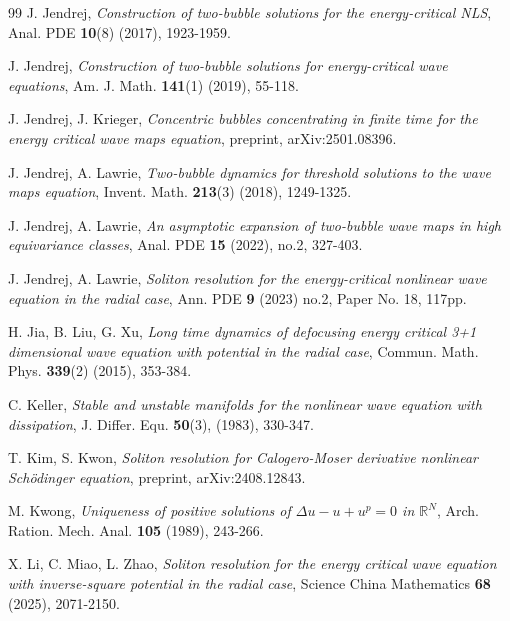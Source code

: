 \documentclass[reqno]{amsart}
\theoremstyle{plain}
\theoremstyle{definition}
\numberwithin{equation}{section}
\newcommand{\1}{\mathbbm{1}}
\begin{document}
\begin{thebibliography}{99}
 J. Jendrej,
\textit{Construction of two-bubble solutions for the energy-critical NLS},
Anal. PDE \textbf{10}(8) (2017), 1923-1959.

 J. Jendrej, 
\textit{Construction of two-bubble solutions for energy-critical wave equations},
Am. J. Math. \textbf{141}(1) (2019), 55-118.

 J. Jendrej, J. Krieger,
\textit{Concentric bubbles concentrating in finite time for the energy critical wave maps equation},
preprint, arXiv:2501.08396.


 J. Jendrej, A. Lawrie,
\textit{Two-bubble dynamics for threshold solutions to the wave maps equation},
Invent. Math. \textbf{213}(3) (2018), 1249-1325.


 J. Jendrej, A. Lawrie,
\textit{An asymptotic expansion of two-bubble wave maps in high equivariance classes},
Anal. PDE \textbf{15} (2022), no.2, 327-403.

 J. Jendrej, A. Lawrie,
\textit{Soliton resolution for the energy-critical nonlinear wave equation in the radial case},
Ann. PDE \textbf{9} (2023) no.2, Paper No. 18, 117pp.



 H. Jia, B. Liu, G. Xu,
\textit{Long time dynamics of defocusing energy critical 3+1 dimensional wave equation with potential in the radial case},
Commun. Math. Phys. \textbf{339}(2) (2015), 353-384.


 C. Keller,
\textit{Stable and unstable manifolds for the nonlinear wave equation with dissipation},
J. Differ. Equ. \textbf{50}(3), (1983), 330-347.


 T. Kim, S. Kwon,
\textit{Soliton resolution for Calogero-Moser derivative nonlinear Sch\"{o}dinger equation},
preprint, arXiv:2408.12843.

 M. Kwong,
\textit{ Uniqueness of positive solutions of $\Delta u-u+u^p=0$ in ${\mathbb{R}}^N$},
Arch. Ration. Mech. Anal. \textbf{105} (1989), 243-266.

 X. Li, C. Miao, L. Zhao,
\textit{Soliton resolution for the energy critical wave equation with inverse-square potential in the radial case},
Science China Mathematics \textbf{68} (2025), 2071-2150.




\end{thebibliography}
\end{document}
